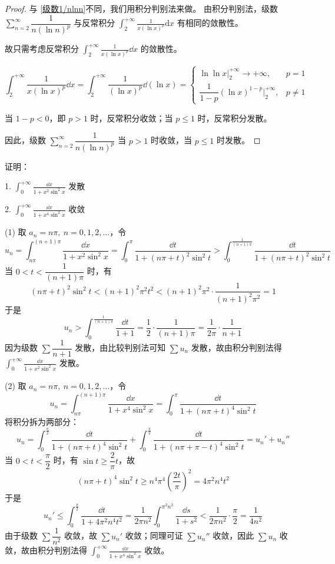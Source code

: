 \begin{proof}
	与 \ref{级数1/nlnn}不同，我们用积分判别法来做。
	由积分判别法，级数 $\sum\limits_{n=2}^{\infty} \dfrac{1}{n(\ln n)^p}$ 与反常积分 $\displaystyle\int_{2}^{+\infty} \frac{1}{x(\ln x)^p} \mathrm{d}x$ 有相同的敛散性。
	
	故只需考虑反常积分 $\displaystyle\int_{2}^{+\infty} \frac{1}{x(\ln x)^p} \dd x$ 的敛散性。
	
	\[
	\int_{2}^{+\infty} \frac{1}{x(\ln x)^p} \dd x
	= \int_{2}^{+\infty} \frac{1}{(\ln x)^p} \dd (\ln x)
	=
	\begin{cases}
		\ln \ln x \Big|_{2}^{+\infty} \to +\infty, & p=1 \\[6pt]
		\dfrac{1}{1-p} (\ln x)^{1-p} \Big|_{2}^{+\infty}, & p \ne 1
	\end{cases}
	\]
	
	当 $1-p < 0$，即 $p>1$ 时，反常积分收敛；当 $p \le 1$ 时，反常积分发散。
	
	因此，级数 $\sum\limits_{n=2}^{\infty} \dfrac{1}{n(\ln n)^p}$ 当 $p>1$ 时收敛，当 $p \le 1$ 时发散。
	
\end{proof}
\begin{example}
	证明：
	
	1.  $\displaystyle \int_{0}^{+\infty} \frac{\dd x}{1+x^2\sin^2 x}$ 发散
	
	2.  $\displaystyle \int_{0}^{+\infty} \frac{\dd x}{1+x^4\sin^2 x}$ 收敛
\end{example}
\begin{solution}
	(1) 取 $a_n = n\pi,\ n=0,1,2,\dots$，令
	\[
	u_n = \int_{n\pi}^{(n+1)\pi} \frac{\dd x}{1+x^2\sin^2 x}
	= \int_{0}^{\pi} \frac{\dd t}{1+(n\pi+t)^2\sin^2 t}
	> \int_{0}^{\frac{1}{(n+1)\pi}} \frac{\dd t}{1+(n\pi+t)^2\sin^2 t}
	\]
	当 $0 < t < \dfrac{1}{(n+1)\pi}$ 时，有
	\[
	(n\pi+t)^2\sin^2 t < (n+1)^2\pi^2 t^2 < (n+1)^2\pi^2 \cdot \frac{1}{(n+1)^2\pi^2} = 1
	\]
	于是
	\[
	u_n > \int_{0}^{\frac{1}{(n+1)\pi}} \frac{\dd t}{1+1} = \frac{1}{2} \cdot \frac{1}{(n+1)\pi} = \frac{1}{2\pi} \cdot \frac{1}{n+1}
	\]
	因为级数 $\sum \dfrac{1}{n+1}$ 发散，由比较判别法可知 $\sum u_n$ 发散，故由积分判别法得 $\displaystyle \int_{0}^{+\infty} \frac{\dd x}{1+x^2\sin^2 x}$ 发散。
	
	(2) 取 $a_n = n\pi,\ n=0,1,2,\dots$，令
	\[
	u_n = \int_{n\pi}^{(n+1)\pi} \frac{\dd x}{1+x^4\sin^2 x}
	= \int_{0}^{\pi} \frac{\dd t}{1+(n\pi+t)^4\sin^2 t}
	\]
	将积分拆为两部分：
	\[
	u_n = \int_{0}^{\frac{\pi}{2}} \frac{\dd t}{1+(n\pi+t)^4\sin^2 t} + \int_{0}^{\frac{\pi}{2}} \frac{\dd t}{1+(n\pi+\pi-t)^4\sin^2 t} = u_n' + u_n''
	\]
	当 $0 < t < \dfrac{\pi}{2}$ 时，有 $\sin t \ge \dfrac{2}{\pi}t$，故
	\[
	(n\pi+t)^4\sin^2 t \ge n^4\pi^4 \left(\frac{2t}{\pi}\right)^2 = 4\pi^2n^4t^2
	\]
	于是
	\[
	u_n' \le \int_{0}^{\frac{\pi}{2}} \frac{\dd t}{1+4\pi^2n^4t^2}
	= \frac{1}{2\pi n^2} \int_{0}^{\pi^2n^2} \frac{\dd s}{1+s^2}
	< \frac{1}{2\pi n^2} \cdot \frac{\pi}{2} = \frac{1}{4n^2}
	\]
	由于级数 $\sum \dfrac{1}{n^2}$ 收敛，故 $\sum u_n'$ 收敛；同理可证 $\sum u_n''$ 收敛，因此 $\sum u_n$ 收敛，故由积分判别法得 $\displaystyle \int_{0}^{+\infty} \frac{\dd x}{1+x^4\sin^2 x}$ 收敛。
\end{solution}
